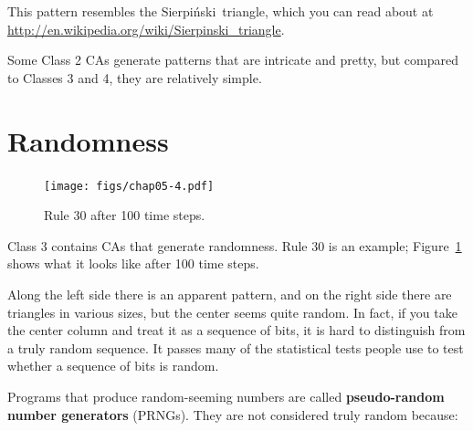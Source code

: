 \documentclass[12pt]{book}
\theoremstyle{exercise}
\newcommand{\py}{\verb}%}
\begin{document}
 
\newcommand{\Sierpinski}{Sierpi\'{n}ski}

This pattern resembles the \Sierpinski~triangle, which
you can read about at \url{http://en.wikipedia.org/wiki/Sierpinski_triangle}.

Some Class 2 CAs generate patterns that are intricate and
pretty, but compared to Classes 3 and 4, they are relatively
simple.


\section{Randomness}

\begin{figure}
\centerline{\texttt{[image: figs/chap05-4.pdf]}}
\caption{Rule 30 after 100 time steps.}
\label{chap05-4}
\end{figure}

Class 3 contains CAs that generate randomness.
Rule 30 is an example; Figure~\ref{chap05-4} shows what it looks like
after 100 time steps.

Along the left side there is an apparent pattern, and on the right
side there are triangles in various sizes, but the center seems
quite random.  In fact, if you take the center column and treat it as a
sequence of bits, it is hard to distinguish from a truly random
sequence.  It passes many of the statistical tests people use
to test whether a sequence of bits is random.

Programs that produce random-seeming numbers are called
{\bf pseudo-random number generators} (PRNGs).  They are not considered
truly random because:


\end{document}
